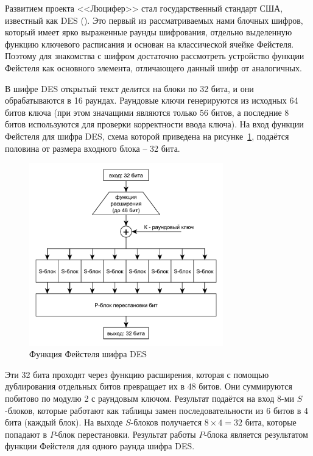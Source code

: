 
Развитием проекта <<Люцифер>> стал государственный стандарт США, известный как DES (). Это первый из рассматриваемых нами блочных шифров, который имеет ярко выраженные раунды шифрования, отдельно выделенную функцию ключевого расписания и основан на классической ячейке Фейстеля. Поэтому для знакомства с шифром достаточно рассмотреть устройство функции Фейстеля как основного элемента, отличающего данный шифр от аналогичных.

В шифре DES открытый текст делится на блоки по 32 бита, и они обрабатываются в 16 раундах. Раундовые ключи генерируются из исходных 64 битов ключа (при этом значащими являются только 56 битов, а последние 8 битов используются для проверки корректности ввода ключа). На вход функции Фейстеля для шифра DES, схема которой приведена на рисунке~\ref{fig:des}, подаётся половина от размера входного блока -- 32 бита.

\begin{figure}[!htb]
    \centering
    \includegraphics[width=0.75\textwidth]{pic/des}
    \caption{Функция Фейстеля шифра DES\label{fig:des}}
\end{figure}

Эти 32 бита проходят через функцию расширения, которая с помощью дублирования отдельных битов превращает их в 48 битов. Они суммируются побитово по модулю 2 с раундовым ключом. Результат подаётся на вход 8-ми $S$-блоков, которые работают как таблицы замен последовательности из 6 битов в 4 бита (каждый блок). На выходе $S$-блоков получается $8 \times 4 = 32$ бита, которые попадают в $P$-блок перестановки. Результат работы $P$-блока является результатом функции Фейстеля для одного раунда шифра DES.

